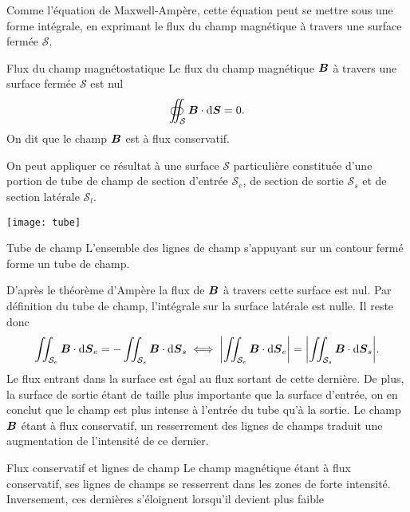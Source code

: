 Comme l'équation de Maxwell-Ampère, cette équation peut se mettre sous une forme
intégrale, en exprimant le flux du champ magnétique à travers une surface fermée
$\mathcal{S}$.

\begin{defn}{Flux du champ magnétostatique}
	Le flux du champ magnétique $\vecb$ à travers une surface fermée 
	$\mathcal{S}$ est nul
	\begin{equation*}
		\oiint_\mathcal{S} \vecb \cdot \ds = 0.
	\end{equation*}
	On dit que le champ $\vecb$ est à flux conservatif.
\end{defn}

	\begin{minipage}{0.6\linewidth}
	On peut appliquer ce résultat à une surface $\mathcal{S}$ particulière
	constituée d'une portion de tube de champ de section d'entrée $\mathcal{S}_e$,
	de section de sortie $\mathcal{S}_s$ et de section latérale $
	\mathcal{S}_l$. 	
	\end{minipage}
	\hfill
	\begin{minipage}{0.3\linewidth}
	\texttt{[image: tube]}
	\end{minipage}
	\vspace{0.5cm}

\begin{defn}{Tube de champ}
	L'ensemble des lignes de champ s'appuyant sur un contour fermé forme un 
	tube de champ.
\end{defn}
	
	D'après le théorème d'Ampère la flux de $\vecb$ à
	travers cette surface est nul.
	Par définition du tube de champ, l'intégrale sur la surface 
	latérale est nulle. Il reste donc 
	\begin{equation*}
		\iint_{\mathcal{S}_e} \vecb \cdot \ds_e =
		- \iint_{\mathcal{S}_s} \vecb \cdot \ds_s 
		\iff
		\displaystyle{\left\lvert\iint_{\mathcal{S}_e} \vecb \cdot \ds_e\right\rvert =
		\left\lvert\iint_{\mathcal{S}_s} \vecb \cdot \ds_s\right\rvert}.
	\end{equation*}
	Le flux entrant dans la surface est égal au flux sortant de cette dernière.
	De plus, la surface de sortie étant de taille plus importante que 
	la surface d'entrée, on en conclut que le champ est plus intense
	à l'entrée du tube qu'à la sortie. Le champ $\vecb$ étant à flux
	conservatif, un resserrement des lignes de champs traduit une augmentation
	de l'intensité de ce dernier.

\begin{defn}{Flux conservatif et lignes de champ}
	Le champ magnétique étant à flux conservatif, ses lignes de champs
	se resserrent dans les zones de forte intensité. Inversement, ces dernières
	s'éloignent lorsqu'il devient plus faible
\end{defn}

